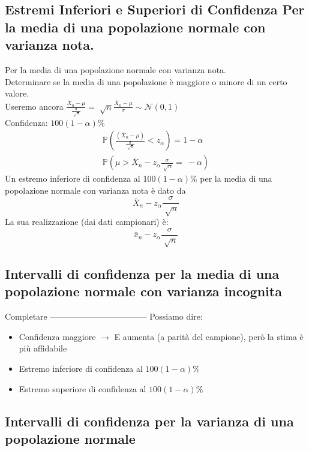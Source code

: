 \subsection*{Estremi Inferiori e Superiori di Confidenza Per la media di una popolazione normale con varianza nota.}
Per la media di una popolazione normale con varianza nota.
\\ Determinare se la media di una popolazione è maggiore o minore di un certo
valore.
\\ Useremo ancora $\frac{\bar{X}_n - \mu}{\frac{\sigma}{\sqrt[]{n}}} = 
\sqrt[]{n} \frac{\bar{X}_n - \mu}{\sigma} \sim \mathcal{N}(0,1)$ 
\\ Confidenza: $100(1-\alpha) \%$
\begin{gather*}
    \mathbb{P}(\frac{(\bar{X}_n - \mu)}{\frac{\sigma}{\sqrt[]{n}}} < z_\alpha) 
    = 1 - \alpha \\
    \mathbb{P}(\mu > \bar{X}_n - z_\alpha \frac{\sigma}{\sqrt[]{n}} = \ - \alpha)
\end{gather*}
Un estremo inferiore di confidenza al $100(1-\alpha)\%$ per la media di una
popolazione normale con varianza nota è dato da
\begin{equation*}
    \bar{X}_n - z_\alpha \frac{\sigma}{\sqrt[]{n}}
\end{equation*}
La sua realizzazione (dai dati campionari) è:
\begin{equation*}
    \bar{x}_n - z_\alpha\frac{\sigma}{\sqrt[]{n}}
\end{equation*}
\subsection*{Intervalli di confidenza per la media di una popolazione normale con varianza incognita}
Completare -----------------------------------
Possiamo dire:
\begin{itemize}
    \item Confidenza maggiore $\rightarrow$ E aumenta (a parità del campione), però la
    stima è più affidabile
    \item Estremo inferiore di confidenza al $100(1-\alpha) \%$
    \item Estremo superiore di confidenza al $100(1-\alpha) \%$
\end{itemize}
\subsection*{Intervalli di confidenza per la varianza di una popolazione normale}


